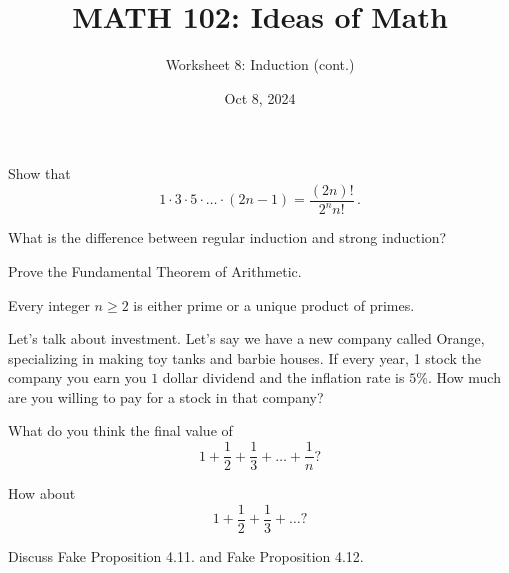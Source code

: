 \documentclass[12pt]{amsart}
\title{ MATH 102: Ideas  of Math }
\author{ Worksheet 8: Induction (cont.) }
\date{Oct 8, 2024}
\begin{document}
\maketitle

\begin{question}
	Show that
	\begin{equation*}
		1 \cdot 3 \cdot 5 \cdot \dots \cdot (2n -1) = \frac{(2n)!}{2^n n!} \,.
	\end{equation*}
\end{question}

\vspace{5cm}

\begin{question}
	What is the difference between regular induction and strong induction?
\end{question}

\vspace{7cm}

\begin{question}
	Prove the Fundamental Theorem of Arithmetic.

	Every integer $n\geq 2$ is either prime or a unique product of primes.
\end{question}

\vspace{5cm}

\begin{question}
	Let's talk about investment.
	Let's say we have a new company called Orange, specializing in making toy tanks and barbie houses.
	If every year, 1 stock the company you earn you $1$ dollar dividend and the inflation rate is $5\%$.
	How much are you willing to pay for a stock in that company?
\end{question}
\vspace{5cm}


\begin{question}
	What do you think the final value of
	\begin{equation*}
		1 + \frac12 + \frac13 + \dots + \frac1n?
	\end{equation*}

	\vspace{5cm}
	How about
	\begin{equation*}
		1 + \frac12 + \frac13 + \dots ?
	\end{equation*}
\end{question}

\vspace{5cm}


\begin{question}
	Discuss Fake Proposition 4.11. and Fake Proposition 4.12.
\end{question}
\end{document}
